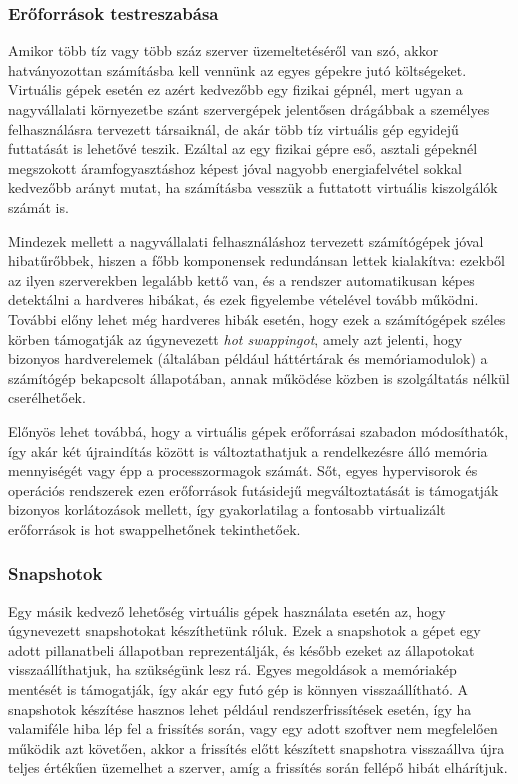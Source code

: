 \subsubsection{Erőforrások testreszabása}
Amikor több tíz vagy több száz szerver üzemeltetéséről van szó, akkor hatványozottan számításba kell vennünk az egyes gépekre jutó költségeket. Virtuális gépek esetén ez azért kedvezőbb egy fizikai gépnél, mert ugyan a nagyvállalati környezetbe szánt szervergépek jelentősen drágábbak a személyes felhasználásra tervezett társaiknál, de akár több tíz virtuális gép egyidejű futtatását is lehetővé teszik. Ezáltal az egy fizikai gépre eső, asztali gépeknél megszokott áramfogyasztáshoz képest jóval nagyobb energiafelvétel sokkal kedvezőbb arányt mutat, ha számításba vesszük a futtatott virtuális kiszolgálók számát is.

Mindezek mellett a nagyvállalati felhasználáshoz tervezett számítógépek jóval hibatűrőbbek, hiszen a főbb komponensek redundánsan lettek kialakítva: ezekből az ilyen szerverekben legalább kettő van, és a rendszer automatikusan képes detektálni a hardveres hibákat, és ezek figyelembe vételével tovább működni. További előny lehet még hardveres hibák esetén, hogy ezek a számítógépek széles körben támogatják az úgynevezett \textit{hot swappingot}, amely azt jelenti, hogy bizonyos hardverelemek (általában például háttértárak és memóriamodulok) a számítógép bekapcsolt állapotában, annak működése közben is szolgáltatás nélkül cserélhetőek.

Előnyös lehet továbbá, hogy a virtuális gépek erőforrásai szabadon módosíthatók, így akár két újraindítás között is változtathatjuk a rendelkezésre álló memória mennyiségét vagy épp a processzormagok számát. Sőt, egyes hypervisorok és operációs rendszerek ezen erőforrások futásidejű megváltoztatását is támogatják bizonyos korlátozások mellett, így gyakorlatilag a fontosabb virtualizált erőforrások is hot swappelhetőnek tekinthetőek.

\subsubsection{Snapshotok}
Egy másik kedvező lehetőség virtuális gépek használata esetén az, hogy úgynevezett snapshotokat készíthetünk róluk. Ezek a snapshotok a gépet egy adott pillanatbeli állapotban reprezentálják, és később ezeket az állapotokat visszaállíthatjuk, ha szükségünk lesz rá. Egyes megoldások a memóriakép mentését is támogatják, így akár egy futó gép is könnyen visszaállítható. A snapshotok készítése hasznos lehet például rendszerfrissítések esetén, így ha valamiféle hiba lép fel a frissítés során, vagy egy adott szoftver nem megfelelően működik azt követően, akkor a frissítés előtt készített snapshotra visszaállva újra teljes értékűen üzemelhet a szerver, amíg a frissítés során fellépő hibát elhárítjuk.

